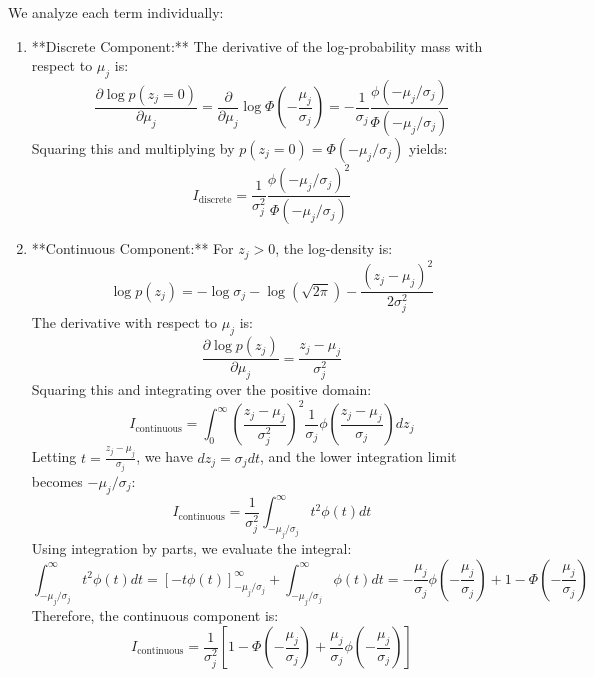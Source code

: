 We analyze each term individually:
\begin{enumerate}\setlength{\itemsep}{0.5pt}\setlength{\parskip}{0pt}
    \item **Discrete Component:** The derivative of the log-probability mass with respect to $\mu_j$ is:
    \begin{equation}
    \frac{\partial \log p(z_j = 0)}{\partial \mu_j} = \frac{\partial}{\partial \mu_j} \log \Phi\left(-\frac{\mu_j}{\sigma_j}\right) = -\frac{1}{\sigma_j} \frac{\phi(-\mu_j/\sigma_j)}{\Phi(-\mu_j/\sigma_j)}
    \end{equation}
    Squaring this and multiplying by $p(z_j = 0) = \Phi(-\mu_j / \sigma_j)$ yields:
    \begin{equation}
    I_{\text{discrete}} = \frac{1}{\sigma_j^2} \frac{\phi(-\mu_j/\sigma_j)^2}{\Phi(-\mu_j/\sigma_j)}
    \end{equation}
    
    \item **Continuous Component:** For $z_j > 0$, the log-density is:
    \begin{equation}
    \log p(z_j) = -\log \sigma_j - \log(\sqrt{2\pi}) - \frac{(z_j - \mu_j)^2}{2\sigma_j^2}
    \end{equation}
    The derivative with respect to $\mu_j$ is:
    \begin{equation}
    \frac{\partial \log p(z_j)}{\partial \mu_j} = \frac{z_j - \mu_j}{\sigma_j^2}
    \end{equation}
    Squaring this and integrating over the positive domain:
    \begin{equation}
    I_{\text{continuous}} = \int_0^\infty \left( \frac{z_j - \mu_j}{\sigma_j^2} \right)^2 \frac{1}{\sigma_j} \phi\left( \frac{z_j - \mu_j}{\sigma_j} \right) dz_j
    \end{equation}
    Letting $t = \frac{z_j - \mu_j}{\sigma_j}$, we have $dz_j = \sigma_j dt$, and the lower integration limit becomes $-\mu_j / \sigma_j$:
    \begin{equation}
    I_{\text{continuous}} = \frac{1}{\sigma_j^2} \int_{-\mu_j/\sigma_j}^\infty t^2 \phi(t) dt
    \end{equation}
    Using integration by parts, we evaluate the integral:
    \begin{equation}
    \int_{-\mu_j/\sigma_j}^\infty t^2 \phi(t) dt = \left[ -t\phi(t) \right]_{-\mu_j/\sigma_j}^\infty + \int_{-\mu_j/\sigma_j}^\infty \phi(t) dt = -\frac{\mu_j}{\sigma_j}\phi\left(-\frac{\mu_j}{\sigma_j}\right) + 1 - \Phi\left(-\frac{\mu_j}{\sigma_j}\right)
    \end{equation}
    Therefore, the continuous component is:
    \begin{equation}
    I_{\text{continuous}} = \frac{1}{\sigma_j^2} \left[ 1 - \Phi\left(-\frac{\mu_j}{\sigma_j}\right) + \frac{\mu_j}{\sigma_j} \phi\left(-\frac{\mu_j}{\sigma_j}\right) \right]
    \end{equation}
\end{enumerate}

